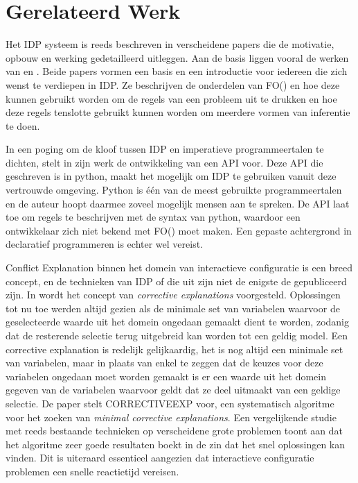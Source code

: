 \chapter{Gerelateerd Werk}
\label{cha:gerelateerdwerk}

Het IDP systeem is reeds beschreven in verscheidene papers die de motivatie, opbouw en werking gedetailleerd uitleggen. Aan de basis liggen vooral de werken van \citep{de2014predicate} en \citep{de2014separating}. Beide papers vormen een basis en een introductie voor iedereen die zich wenst te verdiepen in IDP. Ze beschrijven de onderdelen van FO(\textperiodcentered) en hoe deze kunnen gebruikt worden om de regels van een probleem uit te drukken en hoe deze regels tenslotte gebruikt kunnen worden om meerdere vormen van inferentie te doen. 
\par
In een poging om de kloof tussen IDP en imperatieve programmeertalen te dichten, stelt \citep{vennekens2015lowering} in zijn werk de ontwikkeling van een API voor. Deze API die geschreven is in python, maakt het mogelijk om IDP te gebruiken vanuit deze vertrouwde omgeving. Python is \'{e}\'{e}n van de meest gebruikte programmeertalen en de auteur hoopt daarmee zoveel mogelijk mensen aan te spreken. De API laat toe om regels te beschrijven met de syntax van python, waardoor een ontwikkelaar zich niet bekend met FO(\textperiodcentered) moet maken. Een gepaste achtergrond in declaratief programmeren is echter wel vereist.
\par
Conflict Explanation binnen het domein van interactieve configuratie is een breed concept, en de technieken van IDP of die uit \citep{amilhastre2002consistency} zijn niet de enigste de gepubliceerd zijn. In \citep{o2005generating} wordt het concept van \textit{corrective explanations} voorgesteld. Oplossingen tot nu toe werden altijd gezien als de minimale set van variabelen waarvoor de geselecteerde waarde uit het domein ongedaan gemaakt dient te worden, zodanig dat de resterende selectie terug uitgebreid kan worden tot een geldig model. Een corrective explanation is redelijk gelijkaardig, het is nog altijd een minimale set van variabelen, maar in plaats van enkel te zeggen dat de keuzes voor deze variabelen ongedaan moet worden gemaakt is er een waarde uit het domein gegeven van de variabelen waarvoor geldt dat ze deel uitmaakt van een geldige selectie. De paper stelt CORRECTIVEEXP voor, een systematisch algoritme voor het zoeken van \textit{minimal corrective explanations}. Een vergelijkende studie met reeds bestaande technieken op verscheidene grote problemen toont aan dat het algoritme zeer goede resultaten boekt in de zin dat het snel oplossingen kan vinden. Dit is uiteraard essentieel aangezien dat interactieve configuratie problemen een snelle reactietijd vereisen.

